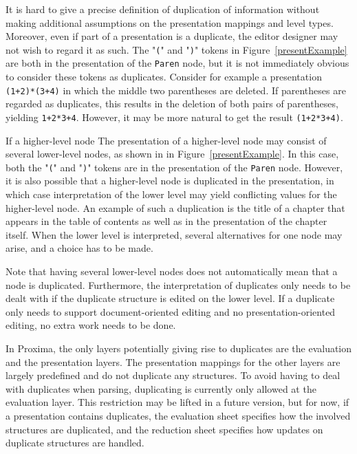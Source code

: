 It is hard to give a precise definition of duplication of information without making additional assumptions on the presentation mappings and level types. Moreover, even if part of a presentation is a duplicate, the editor designer may not wish to regard it as such. The "\verb|(|" and "\verb|)|" tokens in Figure~\ref{presentExample} are both in the presentation of the \verb|Paren| node, but it is not immediately obvious to consider these tokens as duplicates. Consider for example a presentation \verb|(1+2)*(3+4)| in which the middle two parentheses are deleted. If parentheses are regarded as duplicates, this results in the deletion of both pairs of parentheses, yielding \verb|1+2*3+4|. However, it may be more natural to get the result \verb|(1+2*3+4)|.


\bc
If a higher-level node The presentation of a higher-level node may consist of several lower-level nodes, as shown in in Figure~\ref{presentExample}. In this case, both the "\verb|(|" and "\verb|)|" tokens are in the presentation of the \verb|Paren| node. However, it is also possible that a higher-level node is duplicated in the presentation, in which case interpretation of the lower level may yield conflicting values for the higher-level node. An example of such a duplication is the title of a chapter that appears in the table of contents as well as in the presentation of the chapter itself. When the lower level is interpreted, several alternatives for one node may arise, and a choice has to be made.

Note that having several lower-level nodes does not automatically mean that a node is duplicated. Furthermore, the interpretation of duplicates only needs to be dealt with if the duplicate structure is edited on the lower level. If a duplicate only needs to support document-oriented editing and no presentation-oriented editing, no extra work needs to be done.
\ec

In Proxima, the only layers potentially giving rise to duplicates are the evaluation and the presentation layers. The presentation mappings for the other layers are largely predefined and do not duplicate any structures. 
\bc To avoid having to deal with duplicates when parsing, duplicating is currently only allowed at the evaluation layer. This restriction may be lifted in a future version, but for now, if a presentation contains duplicates, the evaluation sheet specifies how the involved structures are duplicated, and the reduction sheet specifies how updates on duplicate structures are handled.
\ec


